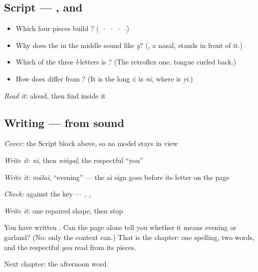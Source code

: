 \subsection*{Script — ,  and }
\begin{itemize}
\raggedright
  \item Which four pieces build \textbf{}? (\textbf{} · \textbf{} · \textbf{} · \textbf{}.)
  \item Why does the \textbf{} in the middle sound like \emph{g}? (\textbf{}, a nasal, stands in front of it.)
  \item Which of the three \emph{l}-letters is \textbf{}? (The retroflex one, tongue curled back.)
  \item How does \textbf{} differ from \textbf{}? (It is the long \emph{ī}: \textbf{} is \emph{nī}, where \textbf{} is \emph{ṟi}.)
\end{itemize}

\emph{Read it:} \textbf{} aloud, then find \textbf{} inside it

\subsection*{Writing — from sound}
\emph{Cover:} the Script block above, so no model stays in view

\emph{Write it:} \emph{nī}, then \emph{nīṅgaḷ}, the respectful \textquotedblleft{}you\textquotedblright{}

\emph{Write it:} \emph{mālai}, \textquotedblleft{}evening\textquotedblright{} — the ai sign goes before its letter on the page

\emph{Check:} against the key — \textbf{}, \textbf{}, \textbf{}

\emph{Write it:} one repaired shape, then stop

\begin{tcolorbox}[breakable,colback=teal!4,colframe=teal!35!black,title={Before you move on}]
You have written \textbf{}. Can the page alone tell you whether it means evening or garland? (No: only the context can.) That is the chapter: one spelling, two words, and the respectful \emph{you} read from its pieces.

Next chapter: the afternoon word.
\end{tcolorbox}
